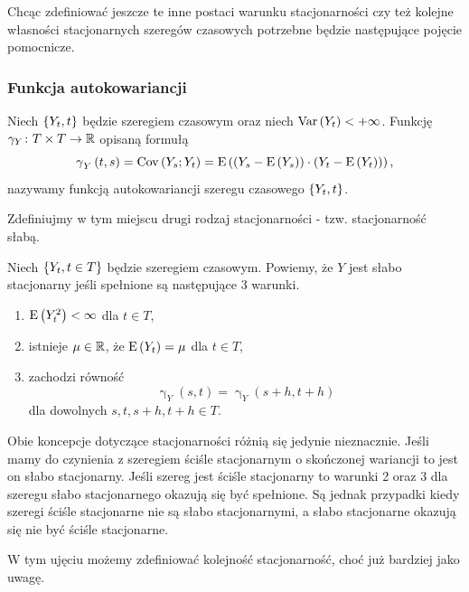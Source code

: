 \documentclass[10pt,a4paper]{book}
\newcommand{\tsAutoCovariance}[3][\gamma]{\operatorname{#1}_{#2} \left({#3}\right)}
\begin{document}
Chcąc zdefiniować jeszcze te inne postaci warunku stacjonarności czy też kolejne własności stacjonarnych szeregów czasowych potrzebne będzie następujące pojęcie pomocnicze.

\subsubsection{Funkcja autokowariancji}

\begin{definition}
Niech $\left\lbrace {{Y_t}, {t}} \right\rbrace$ będzie szeregiem czasowym oraz niech $ \operatorname{Var} \left( {Y_t} \right) < +\infty$. Funkcję $ \gamma_Y \colon T \times T \to \mathbb{R}$ opisaną formułą 
$$
\tsAutoCovariance{Y}{t,s}= \Covariance{Y_s}{Y_t} = \Ex{ \bracket{Y_s - \Ex{Y_s}} \cdot \bracket{Y_t - \Ex{Y_t}}  },
$$
nazywamy funkcją autokowariancji szeregu czasowego $\left\lbrace {{Y_t}, {t}} \right\rbrace$.
\end{definition}

Zdefiniujmy w tym miejscu drugi rodzaj stacjonarności - tzw. stacjonarność słabą.

\begin{definition}
Niech $\left\lbrace {{Y_t}, {t \in T}} \right\rbrace$ będzie szeregiem czasowym. Powiemy, że $Y$ jest słabo stacjonarny jeśli spełnione są następujące 3 warunki.
\begin{enumerate}
\item $ \operatorname{E} \left({Y_t^2} \right) < \infty$ dla $t \in T$,
\item istnieje $\mu \in \mathbb{R}$, że $ \operatorname{E} \left({Y_t} \right) = \mu $ dla $t \in T$,
\item zachodzi równość
$$
\tsAutoCovariance{Y}{s,t}= \tsAutoCovariance{Y}{s+h,t+h}
$$
dla dowolnych $s,t,s+h,t+h \in T$.
\end{enumerate}
\end{definition}

Obie koncepcje dotyczące stacjonarności różnią się jedynie nieznacznie. Jeśli mamy do czynienia z szeregiem ściśle stacjonarnym o skończonej wariancji to jest on słabo stacjonarny. Jeśli szereg jest ściśle stacjonarny to warunki 2 oraz 3 dla szeregu słabo stacjonarnego okazują się być spełnione. Są jednak przypadki kiedy szeregi ściśle stacjonarne nie są słabo stacjonarnymi, a słabo stacjonarne okazują się nie być ściśle stacjonarne.

W tym ujęciu możemy zdefiniować kolejność stacjonarność, choć już bardziej jako uwagę.
\end{document}
